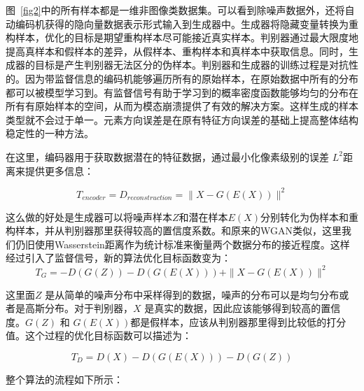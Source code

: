 图~\ref{fig2}中的所有样本都是一维非图像类数据集。可以看到除噪声数据外，还将自动编码机获得的隐向量数据表示形式输入到生成器中。生成器将隐藏变量转换为重构样本，优化的目标是期望重构样本尽可能接近真实样本。判别器通过最大限度地提高真样本和假样本的差异，从假样本、重构样本和真样本中获取信息。同时，生成器的目标是产生判别器无法区分的伪样本。判别器和生成器的训练过程是对抗性的。因为带监督信息的编码机能够遍历所有的原始样本，在原始数据中所有的分布都可以被模型学习到。有监督信号有助于学习到的概率密度函数能够均匀的分布在所有有原始样本的空间，从而为模态崩溃提供了有效的解决方案。这样生成的样本类型就不会过于单一。元素方向误差是在原有特征方向误差的基础上提高整体结构稳定性的一种方法。

在这里，编码器用于获取数据潜在的特征数据，通过最小化像素级别的误差 $ L ^ { 2 } $距离来提供更多信息：

\begin{equation}
\label{eq11}
T_{encoder} = D_{reconstruction}=\parallel X-G(E(X))\parallel^{2}
\end{equation}

这么做的好处是生成器可以将噪声样本$Z$和潜在样本$E(X)$分别转化为伪样本和重构样本，并从判别器那里获得较高的置信度系数。和原来的WGAN类似，这里我们仍旧使用Wasserstein距离作为统计标准来衡量两个数据分布的接近程度。这样经过引入了监督信号，新的算法优化目标函数变为：
\begin{equation}
\label{eq12}
T_{G} = -D(G(Z))-D(G(E(X)))+\parallel X-G(E(X))\parallel^{2}
\end{equation}

这里面$Z$ 是从简单的噪声分布中采样得到的数据，噪声的分布可以是均匀分布或者是高斯分布。对于判别器，$X$ 是真实的数据，因此应该能够得到较高的置信度。$G(Z)$ 和 $G(E(X))$都是假样本，应该从判别器那里得到比较低的打分值。这个过程的优化目标函数可以描述为：

\begin{equation}
\label{eq12}
T_{D} = D(X)-D(G(E(X)))-D(G(Z))
\end{equation}

整个算法的流程如下所示：

